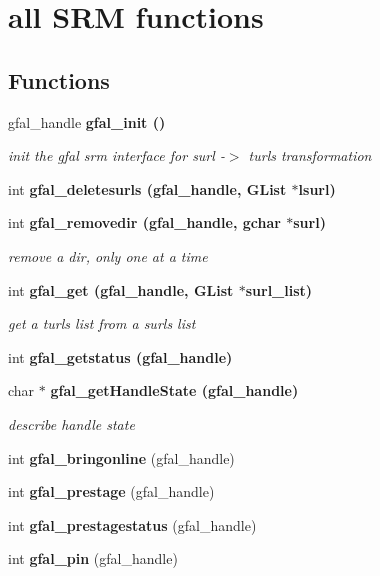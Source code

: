 \section{all SRM functions}
\label{group__srm__group}
\subsection*{Functions}
\begin{CompactItemize}
\item 
gfal\_\-handle \bf{gfal\_\-init} ()
\begin{CompactList}\small\item\em init the gfal srm interface for surl -$>$ turls transformation \item\end{CompactList}\item 
int \bf{gfal\_\-deletesurls} (gfal\_\-handle, GList $\ast$lsurl)
\item 
int \bf{gfal\_\-removedir} (gfal\_\-handle, gchar $\ast$surl)\label{group__srm__group_gff1cd1d3df193f577ebb2fe108aa0b6c}

\begin{CompactList}\small\item\em remove a dir, only one at a time \item\end{CompactList}\item 
int \bf{gfal\_\-get} (gfal\_\-handle, GList $\ast$surl\_\-list)
\begin{CompactList}\small\item\em get a turls list from a surls list \item\end{CompactList}\item 
int \bf{gfal\_\-getstatus} (gfal\_\-handle)
\item 
char $\ast$ \bf{gfal\_\-get\-Handle\-State} (gfal\_\-handle)
\begin{CompactList}\small\item\em describe handle state \item\end{CompactList}\item 
int \textbf{gfal\_\-bringonline} (gfal\_\-handle)\label{group__srm__group_g17710c0eaab072ece70a7138b598f0b0}

\item 
int \textbf{gfal\_\-prestage} (gfal\_\-handle)\label{group__srm__group_g05a256007ca8303bbf31c1148cc23995}

\item 
int \textbf{gfal\_\-prestagestatus} (gfal\_\-handle)\label{group__srm__group_g575ef65953139a8439575376437cd2f1}

\item 
int \textbf{gfal\_\-pin} (gfal\_\-handle)\label{group__srm__group_g1b450340e97429bf3eb42078c4626048}

\end{CompactItemize}


